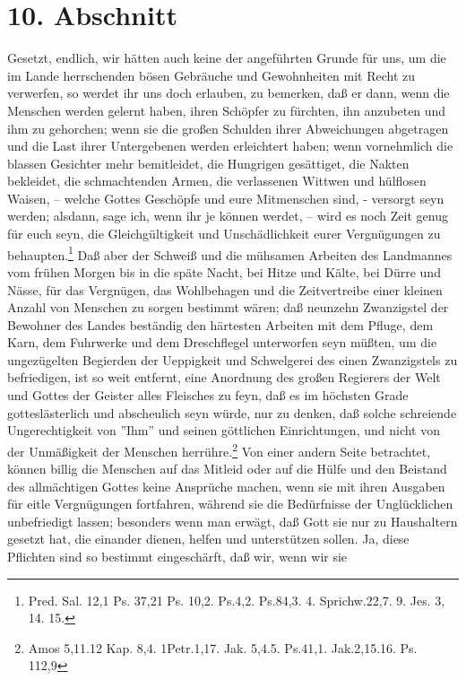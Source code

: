 \section{10. Abschnitt}

Gesetzt, endlich, wir hätten auch keine der angeführten Grunde für uns, um die
im Lande herrschenden bösen Gebräuche und Gewohnheiten mit Recht zu verwerfen,
so werdet ihr uns doch erlauben, zu bemerken, daß er dann, wenn die Menschen
werden gelernt haben, ihren Schöpfer zu fürchten, ihn anzubeten und ihm zu
gehorchen; wenn sie die großen Schulden ihrer Abweichungen abgetragen und die
Last ihrer Untergebenen werden erleichtert haben; wenn vornehmlich die blassen
Gesichter mehr bemitleidet, die Hungrigen gesättiget, die Nakten bekleidet, die
schmachtenden Armen, die verlassenen Wittwen und hülflosen Waisen, -- welche
Gottes Geschöpfe und eure Mitmenschen sind, - versorgt seyn werden; alsdann,
sage ich, wenn ihr je können werdet, – wird es noch Zeit genug für euch seyn,
die Gleichgültigkeit und Unschädlichkeit eurer Vergnügungen zu
behaupten.\footnote{Pred. Sal. 12,1 Ps. 37,21 Ps. 10,2. Ps.4,2. Ps.84,3. 4.
Sprichw.22,7. 9. Jes. 3, 14. 15.} Daß aber der Schweiß und die mühsamen Arbeiten
des Landmannes vom frühen Morgen bis in die späte Nacht, bei Hitze und Kälte,
bei Dürre und Nässe, für das Vergnügen, das Wohlbehagen und die Zeitvertreibe
einer kleinen Anzahl von Menschen zu sorgen bestimmt wären; daß neunzehn
Zwanzigstel der Bewohner des Landes beständig den härtesten Arbeiten mit dem
Pfluge, dem Karn, dem Fuhrwerke und dem Dreschflegel unterworfen seyn müßten, um
die ungezügelten Begierden der Ueppigkeit und Schwelgerei des einen Zwanzigstels
zu befriedigen, ist so weit entfernt, eine Anordnung des großen Regierers der
Welt und Gottes der Geister alles Fleisches zu feyn, daß es im höchsten Grade
gotteslästerlich und abscheulich seyn würde, nur zu denken, daß solche
schreiende Ungerechtigkeit von ''Ihm'' und seinen göttlichen Einrichtungen, und
nicht von der Unmäßigkeit der Menschen herrühre.\footnote{Amos 5,11.12 Kap. 8,4.
1Petr.1,17. Jak. 5,4.5. Ps.41,1. Jak.2,15.16. Ps. 112,9} Von einer andern Seite
betrachtet, können billig die Menschen auf das Mitleid oder auf die Hülfe und
den Beistand des allmächtigen Gottes keine Ansprüche machen, wenn sie mit ihren
Ausgaben für eitle Vergnügungen fortfahren, während sie die Bedürfnisse der
Unglücklichen unbefriedigt lassen; besonders wenn man erwägt, daß Gott sie nur
zu Haushaltern gesetzt hat, die einander dienen, helfen und unterstützen sollen.
Ja, diese Pflichten sind so bestimmt eingeschärft, daß wir, wenn wir sie
